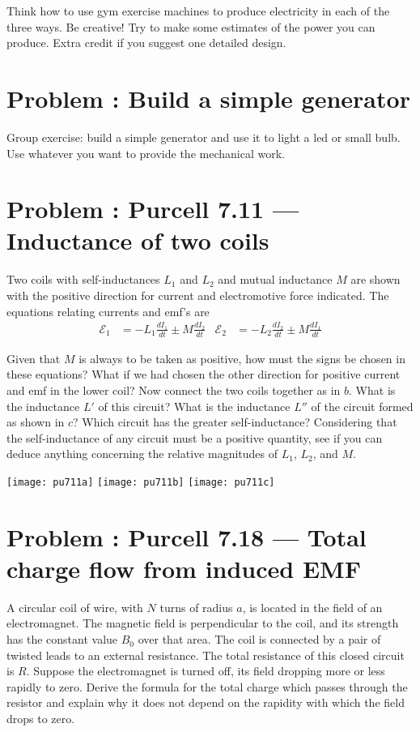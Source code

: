 \documentclass[problems]{esg8022pset}
\begin{document}
  Think how to use gym exercise machines to produce electricity in each of the
  three ways. Be creative!
  Try to make some estimates of the power you can produce. Extra credit if you
  suggest one detailed design.
\section{Problem \thesection: Build a simple generator}
  Group exercise: build a simple generator and use it to light a led or small
  bulb. Use whatever you want to provide the mechanical work.
\section{Problem \thesection: Purcell 7.11 --- Inductance of two coils}
  Two coils with self-inductances $L_1$ and $L_2$ and mutual inductance $M$
  are shown with the positive direction for current and electromotive force
  indicated. The equations relating currents and emf's are
  \begin{align*}
    \mathcal{E}_1 & = -L_1\frac{dI_1}{dt}\pm M\frac{dI_2}{dt}
    & \mathcal{E}_2 & = -L_2\frac{dI_2}{dt}\pm M\frac{dI_1}{dt}
  \end{align*}

  Given that $M$ is always to be taken as positive, how must the signs be
  chosen in these equations? What if we had chosen the other direction for
  positive current and emf in the lower coil? Now connect the two coils
  together as in $b$. What is the inductance $L'$ of this circuit? What is the
  inductance $L''$ of the circuit formed as shown in $c$? Which circuit has the
  greater self-inductance? Considering that the self-inductance of any circuit
  must be a positive quantity, see if you can deduce anything concerning the
  relative magnitudes of $L_1$, $L_2$, and $M$.

  \begin{center}
    \texttt{[image: pu711a]}
    \texttt{[image: pu711b]}
    \texttt{[image: pu711c]}
  \end{center}
\section{Problem \thesection: Purcell 7.18 --- Total charge flow from induced EMF}
  A circular coil of wire, with $N$ turns of radius $a$, is located in the
  field of an electromagnet.  The magnetic field is perpendicular to the coil,
  and its strength has the constant value $B_{0}$ over that area.  The coil is
  connected by a pair of twisted leads to an external resistance. The total
  resistance of this closed circuit is $R$. Suppose the electromagnet is turned
  off, its field dropping more or less rapidly to zero. Derive the formula for
  the total charge which passes through the resistor and explain why it does
  not depend on the rapidity with which the field drops to zero.
\end{document}
